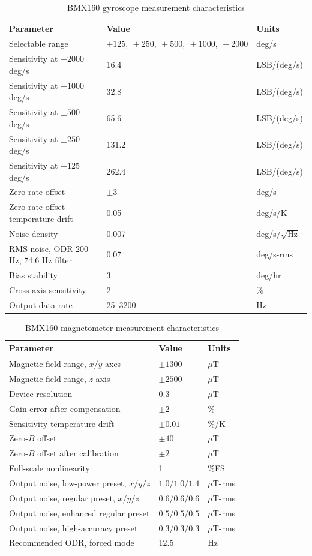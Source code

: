 \documentclass[conference,onecolumn,draftclsnofoot]{IEEEtran}
\begin{document}
\begin{table}[H]
\centering
\caption{BMX160 gyroscope measurement characteristics}
\label{tab:bmx160_gyro_specs}
\begin{tabular}{lll}
\hline
Parameter & Value & Units \\
\hline
Selectable range & $\pm 125,\ \pm 250,\ \pm 500,\ \pm 1000,\ \pm 2000$ & deg/s \\
Sensitivity at $\pm 2000$ deg/s & 16.4 & LSB/(deg/s) \\
Sensitivity at $\pm 1000$ deg/s & 32.8 & LSB/(deg/s) \\
Sensitivity at $\pm 500$ deg/s & 65.6 & LSB/(deg/s) \\
Sensitivity at $\pm 250$ deg/s & 131.2 & LSB/(deg/s) \\
Sensitivity at $\pm 125$ deg/s & 262.4 & LSB/(deg/s) \\
Zero-rate offset & $\pm 3$ & deg/s \\
Zero-rate offset temperature drift & 0.05 & deg/s/K \\
Noise density & 0.007 & deg/s$/\sqrt{\mathrm{Hz}}$ \\
RMS noise, ODR 200 Hz, 74.6 Hz filter & 0.07 & deg/s-rms \\
Bias stability & 3 & deg/hr \\
Cross-axis sensitivity & 2 & \% \\
Output data rate & 25--3200 & Hz \\
\hline
\end{tabular}
\end{table}

\begin{table}[H]
\centering
\caption{BMX160 magnetometer measurement characteristics}
\label{tab:bmx160_mag_specs}
\begin{tabular}{lll}
\hline
Parameter & Value & Units \\
\hline
Magnetic field range, $x/y$ axes & $\pm 1300$ & $\mu$T \\
Magnetic field range, $z$ axis & $\pm 2500$ & $\mu$T \\
Device resolution & 0.3 & $\mu$T \\
Gain error after compensation & $\pm 2$ & \% \\
Sensitivity temperature drift & $\pm 0.01$ & \%/K \\
Zero-$B$ offset & $\pm 40$ & $\mu$T \\
Zero-$B$ offset after calibration & $\pm 2$ & $\mu$T \\
Full-scale nonlinearity & 1 & \%FS \\
Output noise, low-power preset, $x/y/z$ & $1.0/1.0/1.4$ & $\mu$T-rms \\
Output noise, regular preset, $x/y/z$ & $0.6/0.6/0.6$ & $\mu$T-rms \\
Output noise, enhanced regular preset & $0.5/0.5/0.5$ & $\mu$T-rms \\
Output noise, high-accuracy preset & $0.3/0.3/0.3$ & $\mu$T-rms \\
Recommended ODR, forced mode & 12.5 & Hz \\
\hline
\end{tabular}
\end{table}
\end{document}
